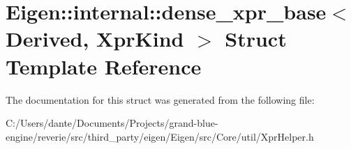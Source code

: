 \hypertarget{struct_eigen_1_1internal_1_1dense__xpr__base}{}\section{Eigen\+::internal\+::dense\+\_\+xpr\+\_\+base$<$ Derived, Xpr\+Kind $>$ Struct Template Reference}
\label{struct_eigen_1_1internal_1_1dense__xpr__base}


The documentation for this struct was generated from the following file\+:\begin{DoxyCompactItemize}
\item 
C\+:/\+Users/dante/\+Documents/\+Projects/grand-\/blue-\/engine/reverie/src/third\+\_\+party/eigen/\+Eigen/src/\+Core/util/Xpr\+Helper.\+h\end{DoxyCompactItemize}

